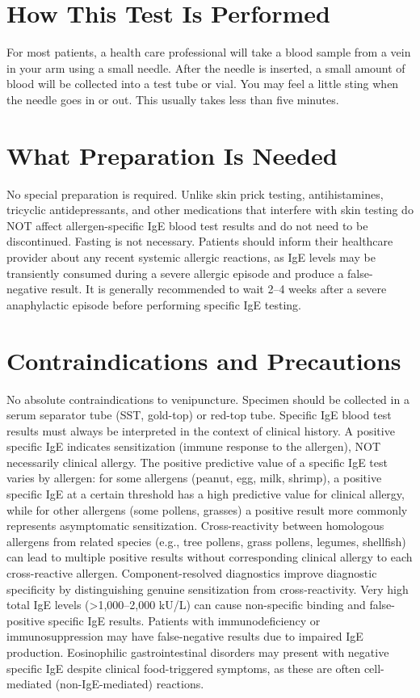 \section*{How This Test Is Performed}
For most patients, a health care professional will take a blood sample from a vein in your arm using a small needle. After the needle is inserted, a small amount of blood will be collected into a test tube or vial. You may feel a little sting when the needle goes in or out. This usually takes less than five minutes.

\section*{What Preparation Is Needed}
No special preparation is required. Unlike skin prick testing, antihistamines, tricyclic antidepressants, and other medications that interfere with skin testing do NOT affect allergen-specific IgE blood test results and do not need to be discontinued. Fasting is not necessary. Patients should inform their healthcare provider about any recent systemic allergic reactions, as IgE levels may be transiently consumed during a severe allergic episode and produce a false-negative result. It is generally recommended to wait 2--4 weeks after a severe anaphylactic episode before performing specific IgE testing.

\section*{Contraindications and Precautions}
No absolute contraindications to venipuncture. Specimen should be collected in a serum separator tube (SST, gold-top) or red-top tube. Specific IgE blood test results must always be interpreted in the context of clinical history. A positive specific IgE indicates sensitization (immune response to the allergen), NOT necessarily clinical allergy. The positive predictive value of a specific IgE test varies by allergen: for some allergens (peanut, egg, milk, shrimp), a positive specific IgE at a certain threshold has a high predictive value for clinical allergy, while for other allergens (some pollens, grasses) a positive result more commonly represents asymptomatic sensitization. Cross-reactivity between homologous allergens from related species (e.g., tree pollens, grass pollens, legumes, shellfish) can lead to multiple positive results without corresponding clinical allergy to each cross-reactive allergen. Component-resolved diagnostics improve diagnostic specificity by distinguishing genuine sensitization from cross-reactivity. Very high total IgE levels (>1,000--2,000 kU/L) can cause non-specific binding and false-positive specific IgE results. Patients with immunodeficiency or immunosuppression may have false-negative results due to impaired IgE production. Eosinophilic gastrointestinal disorders may present with negative specific IgE despite clinical food-triggered symptoms, as these are often cell-mediated (non-IgE-mediated) reactions.

